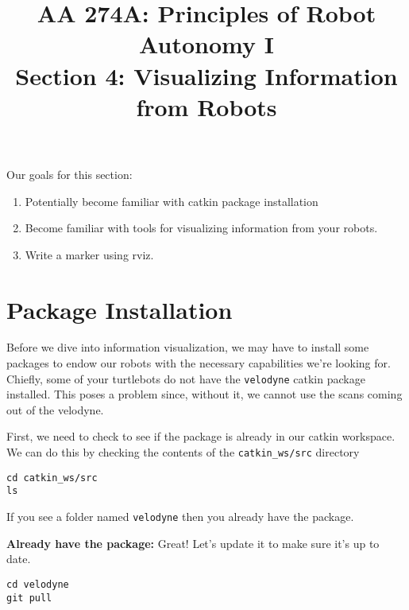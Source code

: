 \documentclass{article}
\title{AA 274A: Principles of Robot Autonomy I \\ Section 4: Visualizing Information from Robots}
\date{}
\begin{document}
\maketitle
\pagestyle{fancy}

Our goals for this section: \begin{enumerate}
	\item Potentially become familiar with catkin package installation
    \item Become familiar with tools for visualizing information from your robots.
    \item Write a marker using rviz.
\end{enumerate}

\section{Package Installation}

Before we dive into information visualization, we may have to install some packages to endow our robots with the necessary capabilities we're looking for. Chiefly, some of your turtlebots do not have the \texttt{velodyne} catkin package installed. This poses a problem since, without it, we cannot use the scans coming out of the velodyne.



First, we need to check to see if the package is already in our catkin workspace. We can do this by checking the contents of the \texttt{catkin\_ws/src} directory
\begin{lstlisting}
cd catkin_ws/src
ls
\end{lstlisting}
If you see a folder named \texttt{velodyne} then you already have the package.

{\bf Already have the package:} Great! Let's update it to make sure it's up to date.
\begin{lstlisting}
cd velodyne
git pull
\end{lstlisting}
\end{document}
